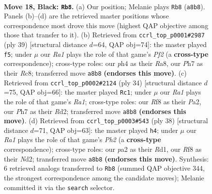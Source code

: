 \documentclass[11pt]{article}
\begin{document}
\clearpage

\begin{figure}[p]\centering
\begin{subfigure}{0.46\textwidth}\centering
\resizebox{\linewidth}{!}{%
\newchessgame
\chessboard[
  setfen={r1b2r2/pp4kp/6p1/2pBbp1n/7P/4P1P1/PP1PKP2/RNB1R3 b - - 2 18},
  showmover=false,
  pgfstyle=straightmove, color=movearrow, markmove={a8-b8}
]}
\caption{}
\end{subfigure}\hfill
\begin{subfigure}{0.46\textwidth}\centering
\resizebox{\linewidth}{!}{%
\newchessgame
\chessboard[
  setfen={r1r3k1/2bb1ppp/p3p3/Pp1n4/1P6/4P3/3BBPPP/1R1RN1K1 b - - 3 20},
  showmover=false,
  pgfstyle=straightmove, color=movearrow, markmove={f7-f5}
]}
\caption{}
\end{subfigure}
\\[4pt]
\begin{subfigure}{0.46\textwidth}\centering
\resizebox{\linewidth}{!}{%
\newchessgame
\chessboard[
  setfen={r1b1r1k1/1p1p1pp1/p1p2n1p/8/n1PN1B2/2P3P1/P2RPPBP/R5K1 w - - 0 18},
  showmover=false,
  pgfstyle=straightmove, color=movearrow, markmove={a1-c1}
]}
\caption{}
\end{subfigure}\hfill
\begin{subfigure}{0.46\textwidth}\centering
\resizebox{\linewidth}{!}{%
\newchessgame
\chessboard[
  setfen={3rnk1r/2p2ppp/1bp1b3/3pB3/pP2P3/3B1P2/P1PN1P1P/3RK1R1 w - - 8 20},
  showmover=false,
  pgfstyle=straightmove, color=movearrow, markmove={h2-h4}
]}
\caption{}
\end{subfigure}
\caption{\textbf{Move 18, Black: \texttt{Rb8}.} (a) Our position; Melanie plays \texttt{Rb8} (\texttt{a8b8}). Panels (b)--(d) are the retrieved master positions whose correspondence most drove this move (highest QAP objective among those that transfer to it). (b) Retrieved from \texttt{ccrl\_top\_p0001\#2987} (ply 39) [structural distance $d$=64, QAP obj=74]: the master played \texttt{f5}; under $\mu$ our \emph{Ra1} plays the role of that game's \emph{Pf2} (a \textbf{cross-type} correspondence); cross-type roles: our \emph{p}h4 as their \emph{R}a8, our \emph{P}h7 as their \emph{R}c8; transferred move \texttt{a8b8} \textbf{(endorses this move)}. (c) Retrieved from \texttt{ccrl\_top\_p0002\#2124} (ply 34) [structural distance $d$=75, QAP obj=66]: the master played \texttt{Rc1}; under $\mu$ our \emph{Ra1} plays the role of that game's \emph{Ra1}; cross-type roles: our \emph{R}f8 as their \emph{P}a2, our \emph{P}h7 as their \emph{R}d2; transferred move \texttt{a8b8} \textbf{(endorses this move)}. (d) Retrieved from \texttt{ccrl\_top\_p0003\#543} (ply 38) [structural distance $d$=71, QAP obj=63]: the master played \texttt{h4}; under $\mu$ our \emph{Ra1} plays the role of that game's \emph{Ph2} (a \textbf{cross-type} correspondence); cross-type roles: our \emph{p}a2 as their \emph{R}d1, our \emph{R}f8 as their \emph{N}d2; transferred move \texttt{a8b8} \textbf{(endorses this move)}. Synthesis: 6 retrieved analogs transferred to \texttt{Rb8} (summed QAP objective 344, the strongest correspondence among the candidate moves); Melanie committed it via the \texttt{search} selector.}
\label{fig:thought-m35}
\end{figure}
\end{document}
